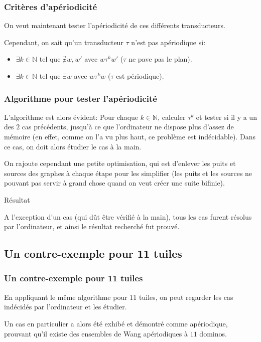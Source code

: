 \documentclass{beamer}
\newcommand{\N}{\mathbb N}
\begin{document}
\begin{frame}
\frametitle{Critères d'apériodicité}

On veut maintenant tester l'apériodicité de ces différents transducteurs.

Cependant, on sait qu'un transducteur $\tau$ n'est pas apériodique si:

\begin{itemize}
    \item $\exists k \in \N$ tel que $\nexists w,w'$ avec $w \tau^k w'$ ($\tau$ ne pave pas le plan).
    \item $\exists k \in \N$ tel que $\exists w$ avec $w \tau^k w$ ($\tau$ est périodique).
\end{itemize}
    
\end{frame}

\begin{frame}
\frametitle{Algorithme pour tester l'apériodicité}

L'algorithme est alors évident: Pour chaque $k \in \N$, calculer $\tau^k$ et tester si il y a un des $2$ cas précédents,
jusqu'à ce que l'ordinateur ne dispose plus d'assez de mémoire (en effet, comme on l'a vu plus haut, ce problème est indécidable).
Dans ce cas, on doit alors étudier le cas à la main.

On rajoute cependant une petite optimisation, qui est d'enlever les puits et sources des graphes à chaque étape pour les simplifier
(les puits et les sources ne pouvant pas servir à grand chose quand on veut créer une suite bifinie).

\begin{block}{Résultat}

A l'exception d'un cas (qui dût être vérifié à la main), tous les cas furent résolus par l'ordinateur, et ainsi le résultat recherché fut prouvé.
    
\end{block}

\end{frame}

\subsection{Un contre-exemple pour 11 tuiles}

\begin{frame}
\frametitle{Un contre-exemple pour 11 tuiles}

En appliquant le même algorithme pour $11$ tuiles, on peut regarder les cas indécidés par l'ordinateur et les étudier.

Un cas en particulier a alors été exhibé et démontré comme apériodique, prouvant qu'il existe des ensembles de Wang
apériodiques à $11$ dominos.


\end{frame}
\end{document}
